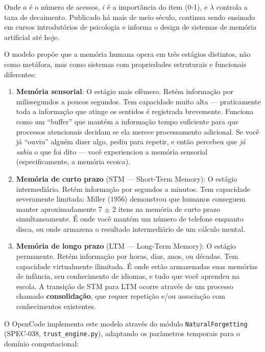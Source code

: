 Onde $a$ é o número de acessos, $i$ é a importância do item (0-1), e $\lambda$ controla a taxa de decaimento. Publicado há mais de meio século, continua sendo ensinado em cursos introdutórios de psicologia e informa o design de sistemas de memória artificial até hoje.

O modelo propõe que a memória humana opera em três estágios distintos, não como metáfora, mas como sistemas com propriedades estruturais e funcionais diferentes:

\begin{enumerate}
    \item \textbf{Memória sensorial}: O estágio mais efêmero. Retém informação por milissegundos a poucos segundos. Tem capacidade muito alta — praticamente toda a informação que atinge os sentidos é registrada brevemente. Funciona como um ``buffer'' que mantém a informação tempo suficiente para que processos atencionais decidam se ela merece processamento adicional. Se você já ``ouviu'' alguém dizer algo, pediu para repetir, e então percebeu que \textit{já sabia} o que foi dito — você experienciou a memória sensorial (especificamente, a memória ecoica).
    
    \item \textbf{Memória de curto prazo} (STM — Short-Term Memory): O estágio intermediário. Retém informação por segundos a minutos. Tem capacidade severamente limitada: Miller (1956)  demonstrou que humanos conseguem manter aproximadamente 7 $\pm$ 2 itens na memória de curto prazo simultaneamente. É onde você mantém um número de telefone enquanto disca, ou onde armazena o resultado intermediário de um cálculo mental.
    
    \item \textbf{Memória de longo prazo} (LTM — Long-Term Memory): O estágio permanente. Retém informação por horas, dias, anos, ou décadas. Tem capacidade virtualmente ilimitada. É onde estão armazenadas suas memórias de infância, seu conhecimento de idiomas, e tudo que você aprendeu na escola. A transição de STM para LTM ocorre através de um processo chamado \textbf{consolidação}, que requer repetição e/ou associação com conhecimentos existentes.
\end{enumerate}

O OpenCode implementa este modelo através do módulo \texttt{NaturalForgetting} (SPEC-038, \texttt{trust\_engine.py}), adaptando os parâmetros temporais para o domínio computacional:

